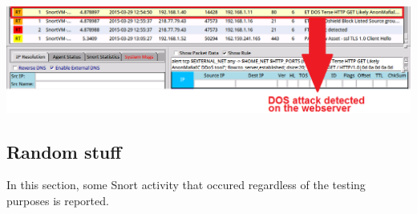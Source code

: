 \documentclass[11pt, a4paper]{article}
\begin{document}
$\;$ \\ \\
\noindent\begin{minipage}{\textwidth}
    \centering
    \includegraphics[width=\textwidth]{DOS_3.png}
\end{minipage}

\clearpage

\subsection*{Random stuff}

In this section, some Snort activity that occured regardless of the testing purposes is reported. \\ \\
\end{document}
